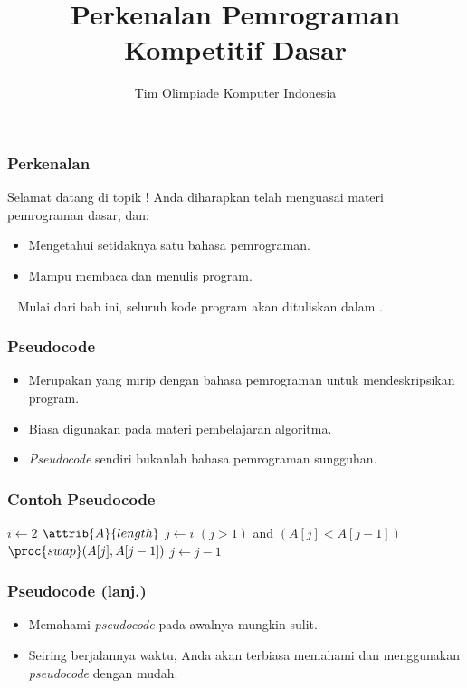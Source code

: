 

\title{Perkenalan Pemrograman Kompetitif Dasar}
\author{Tim Olimpiade Komputer Indonesia}
\date{}



\begin{frame}
\titlepage
\end{frame}

\begin{frame}
\frametitle{Perkenalan}
Selamat datang di topik !
\newline
\newline
Anda diharapkan telah menguasai materi pemrograman dasar, dan:
\begin{itemize}
  \item Mengetahui setidaknya satu bahasa pemrograman.
  \item Mampu membaca dan menulis program.
\end{itemize}
~\newline
Mulai dari bab ini, seluruh kode program akan dituliskan dalam .
\end{frame}

\begin{frame}
\frametitle{Pseudocode}
\begin{itemize}
  \item Merupakan  yang mirip dengan bahasa pemrograman untuk mendeskripsikan program.
  \item Biasa digunakan pada materi pembelajaran algoritma.
  \item \textit{Pseudocode} sendiri bukanlah bahasa pemrograman sungguhan.
\end{itemize}
\end{frame}


\begin{frame}
\frametitle{Contoh Pseudocode}
\begin{codebox}
\li \For $i \gets 2$ \To $\attrib{A}{length}$
    \Do
\li   $j \gets i$
\li   \While $(j > 1)$ and $(A[j] < A[j-1])$
      \Do
\li     $\proc{swap}(A[j], A[j-1])$
\li     $j \gets j-1$
      \End
    \End
\end{codebox}
\end{frame}

\begin{frame}
\frametitle{Pseudocode (lanj.)}
\begin{itemize}
  \item Memahami \textit{pseudocode} pada awalnya mungkin sulit.
  \item Seiring berjalannya waktu, Anda akan terbiasa memahami dan menggunakan \textit{pseudocode} dengan mudah.
\end{itemize}
\end{frame}


